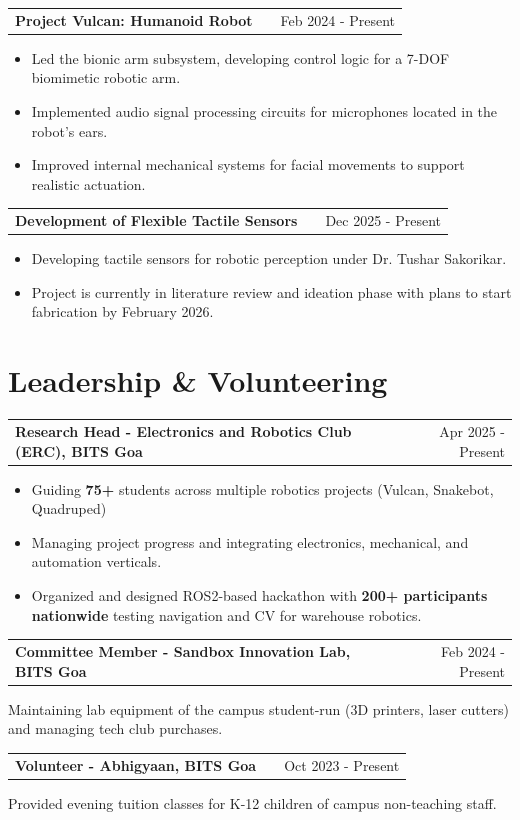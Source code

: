 \documentclass[a4paper,12pt]{article}
\makeatletter
\newenvironment{jobshort}[2]
    {\begin{tabularx}{\linewidth}{@{}l X r@{}} \textbf{#1} & \hfill &  #2 \\[3.75pt] \end{tabularx}}
    {}
\newenvironment{joblong}[2]
    {\begin{tabularx}{\linewidth}{@{}l X r@{}} \textbf{#1} & \hfill &  #2 \\[3.75pt] \end{tabularx}
    \begin{minipage}[t]{\linewidth}
    \begin{itemize}[nosep,after=\strut, leftmargin=1em, itemsep=3pt,label=--]}
    {\end{itemize} \end{minipage}}
\makeatother
\begin{document}
\begin{joblong}{Project Vulcan: Humanoid Robot \href{https://github.com/ERC-BPGC/project-vulcan}{\raisebox{-0.05\height}\faGithub}}{Feb 2024 - Present}
\item Led the bionic arm subsystem, developing control logic for a 7-DOF biomimetic robotic arm.
\item Implemented audio signal processing circuits for microphones located in the robot's ears.
\item Improved internal mechanical systems for facial movements to support realistic actuation.
\end{joblong}

\begin{joblong}{Development of Flexible Tactile Sensors}{Dec 2025 - Present}
\item Developing tactile sensors for robotic perception under Dr. Tushar Sakorikar.
\item Project is currently in literature review and ideation phase with plans to start fabrication by February 2026.
\end{joblong}

\section{Leadership \& Volunteering}
\begin{jobshort}{Research Head - Electronics and Robotics Club (ERC), BITS Goa}{Apr 2025 - Present}
\begin{itemize} [label={-}]
\item Guiding \textbf{75+} students across multiple robotics projects (Vulcan, Snakebot, Quadruped)
\item Managing project progress and integrating electronics, mechanical, and automation verticals.
\item Organized and designed ROS2-based hackathon with \textbf{200+ participants nationwide} testing navigation and CV for warehouse robotics.
\end{itemize}
\end{jobshort}

\begin{jobshort}{Committee Member - Sandbox Innovation Lab, BITS Goa}{Feb 2024 - Present}
Maintaining lab equipment of the campus student-run (3D printers, laser cutters) and managing tech club purchases.
\end{jobshort}

\begin{jobshort}{Volunteer - Abhigyaan, BITS Goa}{Oct 2023 - Present}
Provided evening tuition classes for K-12 children of campus non-teaching staff.
\end{jobshort}

\vfill
{}
\end{document}
